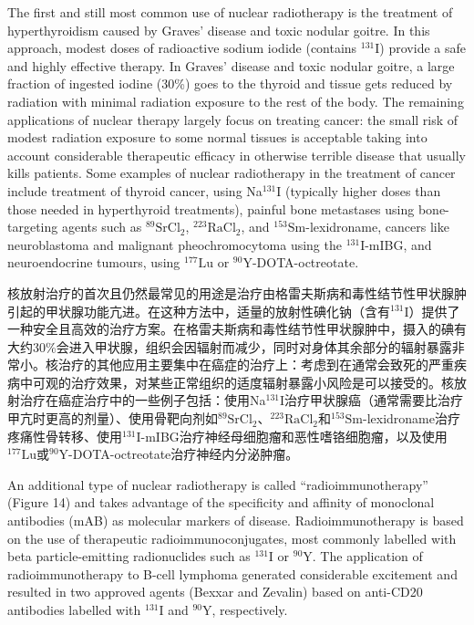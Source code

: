 \documentclass[dvipsnames, svgnames,a4paper,11pt]{article}
\begin{document}
The first and still most common use of nuclear radiotherapy is the treatment of hyperthyroidism caused by Graves’ disease and toxic nodular goitre. In this approach, modest doses of radioactive sodium iodide (contains ${}^\text{131}\text{I}$) provide a safe and highly effective therapy. In Graves’ disease and toxic nodular goitre, a large fraction of ingested iodine (30\%) goes to the thyroid and tissue gets reduced by radiation with minimal radiation exposure to the rest of the body. The remaining applications of nuclear therapy largely focus on treating cancer: the small risk of modest radiation exposure to some normal tissues is acceptable taking into account considerable therapeutic efficacy in otherwise terrible disease that usually kills patients. Some examples of nuclear radiotherapy in the treatment of cancer include treatment of thyroid cancer, using Na${}^\text{131}\text{I}$ (typically higher doses than those needed in hyperthyroid treatments), painful bone metastases using bone-targeting agents such as ${}^\text{89}\text{SrCl}_2$, ${}^\text{223}\text{RaCl}_2$, and ${}^\text{153}\text{Sm}$-lexidroname, cancers like neuroblastoma and malignant pheochromocytoma using the ${}^\text{131}\text{I}$-mIBG, and neuroendocrine tumours, using ${}^\text{177}\text{Lu}$ or ${}^\text{90}\text{Y}$-DOTA-octreotate.

核放射治疗的首次且仍然最常见的用途是治疗由格雷夫斯病和毒性结节性甲状腺肿引起的甲状腺功能亢进。在这种方法中，适量的放射性碘化钠（含有${}^\text{131}\text{I}$）提供了一种安全且高效的治疗方案。在格雷夫斯病和毒性结节性甲状腺肿中，摄入的碘有大约30\%会进入甲状腺，组织会因辐射而减少，同时对身体其余部分的辐射暴露非常小。核治疗的其他应用主要集中在癌症的治疗上：考虑到在通常会致死的严重疾病中可观的治疗效果，对某些正常组织的适度辐射暴露小风险是可以接受的。核放射治疗在癌症治疗中的一些例子包括：使用Na${}^\text{131}\text{I}$治疗甲状腺癌（通常需要比治疗甲亢时更高的剂量）、使用骨靶向剂如${}^\text{89}\text{SrCl}_2$、${}^\text{223}\text{RaCl}_2$和${}^\text{153}\text{Sm}$-lexidroname治疗疼痛性骨转移、使用${}^\text{131}\text{I}$-mIBG治疗神经母细胞瘤和恶性嗜铬细胞瘤，以及使用${}^\text{177}\text{Lu}$或${}^\text{90}\text{Y}$-DOTA-octreotate治疗神经内分泌肿瘤。

An additional type of nuclear radiotherapy is called “radioimmunotherapy” (Figure 14) and takes advantage of the specificity and affinity of monoclonal antibodies (mAB) as molecular markers of disease. Radioimmunotherapy is based on the use of therapeutic radioimmunoconjugates, most commonly labelled with beta particle-emitting radionuclides such as ${}^\text{131}\text{I}$ or ${}^\text{90}\text{Y}$. The application of radioimmunotherapy to B-cell lymphoma generated considerable excitement and resulted in two approved agents (Bexxar and Zevalin) based on anti-CD20 antibodies labelled with ${}^\text{131}\text{I}$ and ${}^\text{90}\text{Y}$, respectively.
\end{document}

